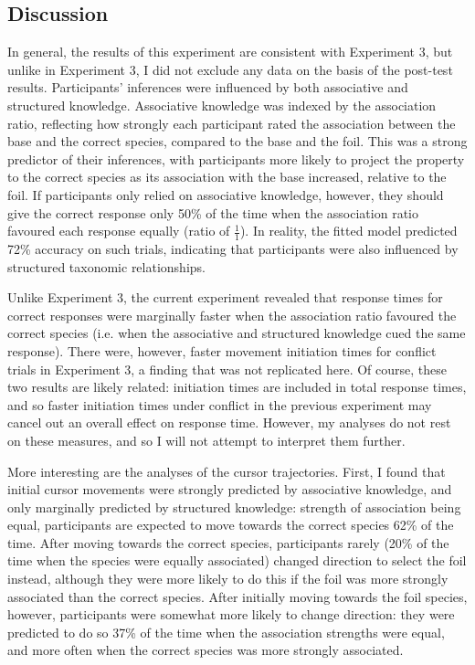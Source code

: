 
\subsection{Discussion}

In general, the results of this experiment
are consistent with Experiment 3,
but unlike in Experiment 3, I did not exclude any data
on the basis of the post-test results.
Participants' inferences were influenced by both
associative and structured knowledge.
Associative knowledge was indexed by the association ratio,
reflecting how strongly each participant rated
the association between the base and the correct species,
compared to the base and the foil.
This was a strong predictor of their inferences,
with participants more likely to project the property
to the correct species as its association with the base increased,
relative to the foil.
If participants only relied on associative knowledge, however,
they should give the correct response only 50\% of the time
when the association ratio favoured each response equally (ratio of $\frac{1}{1}$).
In reality, the fitted model predicted 72\% accuracy on such trials,
indicating that participants were also influenced
by structured taxonomic relationships.

Unlike Experiment 3, the current experiment revealed
that response times for correct responses were
marginally faster when the association ratio favoured the correct species
(i.e. when the associative and structured knowledge cued the same response).
There were, however, faster movement initiation times
for conflict trials in Experiment 3,
a finding that was not replicated here.
Of course, these two results are likely related:
initiation times are included in total response times,
and so faster initiation times under conflict in the previous experiment
may cancel out an overall effect on response time.
However, my analyses do not rest on these measures,
and so I will not attempt to interpret them further.

More interesting are the analyses of the cursor trajectories.
First, I found that initial cursor movements
were strongly predicted by associative knowledge,
and only marginally predicted by structured knowledge:
strength of association being equal,
participants are expected to move towards the correct species 62\% of the time.
After moving towards the correct species,
participants rarely
(20\% of the time when the species were equally associated)
changed direction to select the foil instead,
although they were more likely to do this
if the foil was more strongly associated than the correct species.
After initially moving towards the foil species, however,
participants were somewhat more likely to change direction:
they were predicted to do so 37\% of the time
when the association strengths were equal,
and more often when the correct species was more strongly associated.

